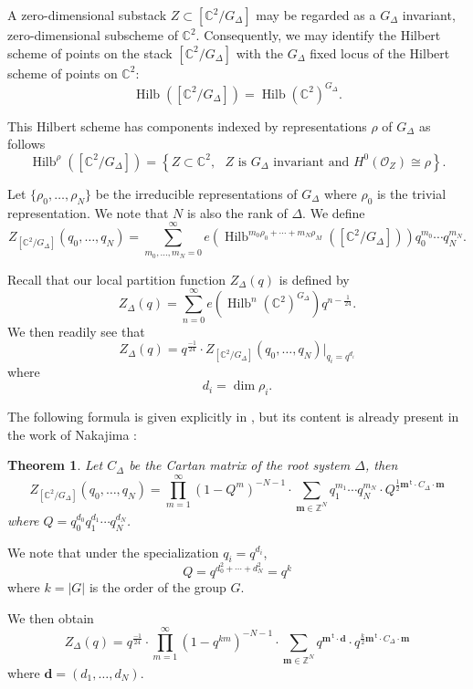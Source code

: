\documentclass{article}
\newtheorem{theorem}{Theorem}[section]
\theoremstyle{definition}
\newcommand{\half}{\frac{1}{2}}
\newcommand{\CC} {{\mathbb C}}          %
\newcommand{\ZZ} {{\mathbb Z}}		%
\renewcommand{\O}{\mathcal{O}}
\renewcommand{\top}{\,\mathsf{t}}
\newcommand{\mvec}{\bm{m}}
\newcommand{\dvec}{\bm{d }}
\newcommand{\Hilb}{\operatorname{Hilb}}
\begin{document}
A zero-dimensional substack $Z\subset [\CC^{2}/G_{\Delta}]$ may be
regarded as a $G_{\Delta}$ invariant, zero-dimensional subscheme of
$\CC^{2}$. Consequently, we may identify the Hilbert scheme of points
on the stack $[\CC^{2}/G_{\Delta}]$ with the $G_{\Delta}$ fixed locus
of the Hilbert scheme of points on $\CC^{2}$: 
\[
\Hilb \left([\CC^{2}/G_{\Delta}] \right) = \Hilb
(\CC^{2})^{G_{\Delta}} .
\]

This Hilbert scheme has components indexed by representations $\rho$
of $G_{\Delta}$ as follows
\begin{equation*}
\Hilb^{\rho} \left([\CC^{2}/G_{\Delta}] \right) = \left\{ Z\subset
\CC^{2}, \text{ $Z$ is $G_{\Delta}$ invariant and $H^{0}(\O_{Z})\cong
\rho $} \right\}.
\end{equation*}

Let $\{\rho_{0},\dotsc ,\rho_{N} \}$ be the irreducible
representations of $G_{\Delta}$ where $\rho_{0}$ is the trivial
representation. We note that $N$ is also the rank of $\Delta$. We
define
\[
Z_{[\CC^{2}/G_{\Delta}]} (q_{0},\dotsc ,q_{N}) = \sum_{m_{0},\dotsc
,m_{N}=0}^{\infty} e\left(\Hilb^{m_{0}\rho_{0}+\dotsb
+m_{N}\rho_{M}}([\CC^{2}/G_{\Delta}]) \right) q_{0}^{m_{0}}\dotsb
q_{N}^{m_{N}} .
\]

Recall that our local partition function $Z_{\Delta}(q)$ is defined by
\[
Z_{\Delta}(q) = \sum_{n=0}^{\infty}
e\left(\Hilb^{n}(\CC^{2})^{G_{\Delta}} \right) q^{n-\frac{1}{24}}. 
\]
We then readily see that
\[
Z_{\Delta}(q) = q^{\frac{-1}{24}}\cdot  Z_{[\CC^{2}/G_{\Delta}]}
(q_{0},\dotsc ,q_{N})|_{q_{i}=q^{d_{i}}}
\]
where
\[
d_{i} =\dim \rho_{i}.
\]

The following formula is given explicitly in \cite[Thm~1.3]{gyenge2015euler}, but its content is already present in the work of Nakajima \cite{nakajima2002geometric}:
\begin{theorem} \label{thm: Zorbifold formula}
Let $C_{\Delta}$ be the Cartan matrix of the root system $\Delta$,
then 
\[
Z_{[\CC^{2}/G_{\Delta}]} (q_{0},\dotsc ,q_{N}) = \prod_{m=1}^{\infty}
(1-Q^{m})^{-N-1} \cdot \sum_{\mvec \in \ZZ^{N}} q_{1}^{m_{1}}\dotsb
q_{N}^{m_{N}} \cdot Q^{\half \mvec^{\top}\cdot C_{\Delta}\cdot \mvec}
\]
where $Q=q_{0}^{d_{0}}q_{1}^{d_{1}}\dotsb q_{N}^{d_{N}}$.
\end{theorem}
We note that under the specialization $q_{i}=q^{d_{i}}$, 
\[
Q=q^{d_{0}^{2}+\dotsb +d_{N}^{2}} = q^{k}
\]
where $k=|G|$ is the order of the group $G$.

We then obtain
\[
Z_{\Delta}(q) = q^{\frac{-1}{24}}\cdot
\prod_{m=1}^{\infty}(1-q^{km})^{-N-1} \cdot \sum_{\mvec \in \ZZ^{N}}
q^{\mvec^{\top}\cdot \dvec} \cdot q^{\frac{k}{2}\mvec^{\top}\cdot C_{\Delta}\cdot \mvec}
\]
where $\dvec =(d_{1},\dotsc ,d_{N})$.
\end{document}
